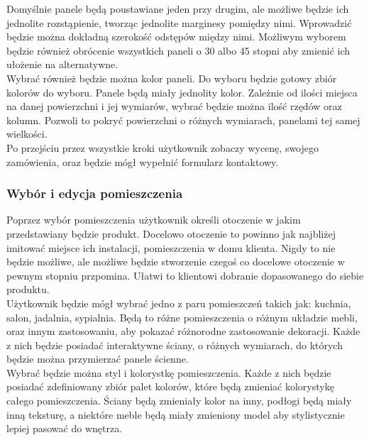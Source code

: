 \documentclass{article} %
\begin{document}
        Domyślnie panele będą poustawiane jeden przy drugim, ale możliwe będzie ich jednolite rozstąpienie, tworząc jednolite marginesy pomiędzy nimi. Wprowadzić będzie można dokładną szerokość odstępów między nimi. Możliwym wyborem będzie również obrócenie wszystkich paneli o 30 albo 45 stopni aby zmienić ich ułożenie na alternatywne.
        \\
        
        Wybrać również będzie można kolor paneli. Do wyboru będzie gotowy zbiór kolorów do wyboru. Panele będą miały jednolity kolor. Zależnie od ilości miejsca na danej powierzchni i jej wymiarów, wybrać będzie można ilość rzędów oraz kolumn. Pozwoli to pokryć powierzchni o różnych wymiarach, panelami tej samej wielkości.
        \\
        
        Po przejściu przez wszystkie kroki użytkownik zobaczy wycenę, swojego zamówienia, oraz będzie mógł wypełnić formularz kontaktowy.
        \\
    
        \subsubsection{Wybór i edycja pomieszczenia}
        Poprzez wybór pomieszczenia użytkownik określi otoczenie w jakim przedstawiany będzie produkt. Docelowo otoczenie to powinno jak najbliżej imitować miejsce ich instalacji, pomieszczenia w domu klienta. Nigdy to nie będzie możliwe, ale możliwe będzie stworzenie czegoś co docelowe otoczenie w pewnym stopniu przpomina. Ułatwi to klientowi dobranie dopasowanego do siebie produktu.
        \\
        
        Użytkownik będzie mógł wybrać jedno z paru pomieszczeń takich jak: kuchnia, salon, jadalnia, sypialnia. Będą to różne pomieszczenia o różnym układzie mebli, oraz innym zastosowaniu, aby pokazać różnorodne zastosowanie dekoracji. Każde z nich będzie posiadać interaktywne ściany, o różnych wymiarach, do których będzie można przymierzać panele ścienne.
        \\
        
        Wybrać będzie można styl i kolorystkę pomieszczenia. Każde z nich będzie posiadać zdefiniowany zbiór palet kolorów, które będą zmieniać kolorystykę całego pomieszczenia. Ściany będą zmieniały kolor na inny, podłogi będą miały inną teksturę, a niektóre meble będą miały zmieniony model aby stylistycznie lepiej pasować do wnętrza.
        \\
        
\end{document}
